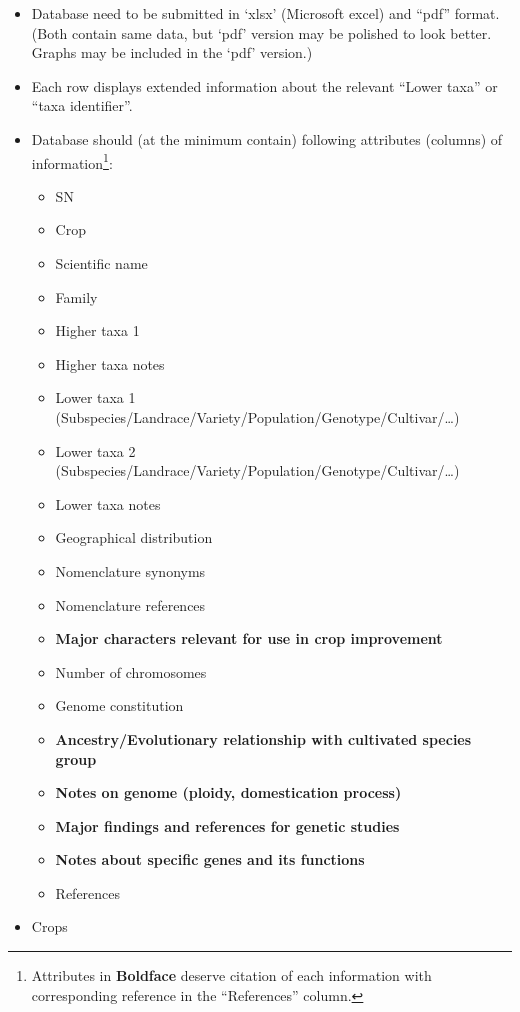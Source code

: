 \documentclass[
]{article}
\providecommand{\tightlist}{%
  \setlength{\itemsep}{0pt}\setlength{\parskip}{0pt}}
\begin{document}
\begin{itemize}
\item
  Database need to be submitted in `xlsx' (Microsoft excel) and ``pdf'' format. (Both contain same data, but `pdf' version may be polished to look better. Graphs may be included in the `pdf' version.)
\item
  Each row displays extended information about the relevant ``Lower taxa'' or ``taxa identifier''.
\item
  Database should (at the minimum contain) following attributes (columns) of information\footnote{Attributes in \textbf{Boldface} deserve citation of each information with corresponding reference in the ``References'' column.}:

  \begin{itemize}
  \tightlist
  \item
    SN
  \item
    Crop
  \item
    Scientific name
  \item
    Family
  \item
    Higher taxa 1
  \item
    Higher taxa notes
  \item
    Lower taxa 1 (Subspecies/Landrace/Variety/Population/Genotype/Cultivar/\ldots)
  \item
    Lower taxa 2 (Subspecies/Landrace/Variety/Population/Genotype/Cultivar/\ldots)
  \item
    Lower taxa notes
  \item
    Geographical distribution
  \item
    Nomenclature synonyms
  \item
    Nomenclature references
  \item
    \textbf{Major characters relevant for use in crop improvement}
  \item
    Number of chromosomes
  \item
    Genome constitution
  \item
    \textbf{Ancestry/Evolutionary relationship with cultivated species group}
  \item
    \textbf{Notes on genome (ploidy, domestication process)}
  \item
    \textbf{Major findings and references for genetic studies}
  \item
    \textbf{Notes about specific genes and its functions}
  \item
    References
  \end{itemize}
\item
  Crops


\end{itemize}
\end{document}
